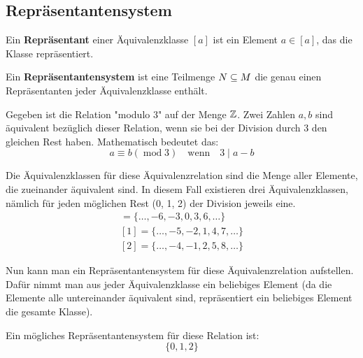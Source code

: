 \documentclass[11pt]{article}
\begin{document}
\subsection{Repräsentantensystem}
Ein \textbf{Repräsentant} einer Äquivalenzklasse $[a]$ ist ein Element $a \in [a]$, das die Klasse repräsentiert.

Ein \textbf{Repräsentantensystem} ist eine Teilmenge $N \subseteq M$ die genau einen Repräsentanten jeder Äquivalenzklasse
enthält.

\begin{bsp}
  Gegeben ist die Relation "modulo 3" auf der Menge $\mathbb{Z}$. Zwei Zahlen $a, b$ sind äquivalent bezüglich dieser Relation,
  wenn sie bei der Division durch 3 den gleichen Rest haben. Mathematisch bedeutet das:
  \[
    a \equiv b(\operatorname{mod} 3) \quad \text{wenn}\quad 3\mid a-b
  \]

  Die Äquivalenzklassen für diese Äquivalenzrelation sind die Menge aller Elemente, die zueinander äquivalent sind.
  In diesem Fall existieren drei Äquivalenzklassen, nämlich für jeden möglichen Rest (0, 1, 2) der Division jeweils eine.
  \begin{align*}
    [0] = \{\ldots, -6, -3, 0, 3, 6, \ldots\} \\
    [1] = \{\ldots, -5, -2, 1, 4, 7, \ldots\} \\
    [2] = \{\ldots, -4, -1, 2, 5, 8, \ldots\}
  \end{align*}

  Nun kann man ein Repräsentantensystem für diese Äquivalenzrelation aufstellen. Dafür nimmt man aus jeder Äquivalenzklasse
  ein beliebiges Element (da die Elemente alle untereinander äquivalent sind, repräsentiert ein beliebiges Element die
  gesamte Klasse).

  Ein mögliches Repräsentantensystem für diese Relation ist:
  \[
    \{0, 1, 2\}
  \]
\end{bsp}
\end{document}
